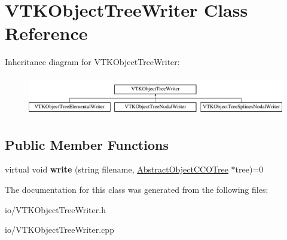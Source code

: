 \hypertarget{class_v_t_k_object_tree_writer}{}\section{V\+T\+K\+Object\+Tree\+Writer Class Reference}
\label{class_v_t_k_object_tree_writer}
Inheritance diagram for V\+T\+K\+Object\+Tree\+Writer\+:\begin{figure}[H]
\begin{center}
\leavevmode
\includegraphics[height=1.736434cm]{d0/d87/class_v_t_k_object_tree_writer}
\end{center}
\end{figure}
\subsection*{Public Member Functions}
\begin{DoxyCompactItemize}
\item 
virtual void {\bfseries write} (string filename, \hyperlink{class_abstract_object_c_c_o_tree}{Abstract\+Object\+C\+C\+O\+Tree} $\ast$tree)=0\hypertarget{class_v_t_k_object_tree_writer_ad4fb3ded12a62224613c0dc6fce8c610}{}\label{class_v_t_k_object_tree_writer_ad4fb3ded12a62224613c0dc6fce8c610}

\end{DoxyCompactItemize}


The documentation for this class was generated from the following files\+:\begin{DoxyCompactItemize}
\item 
io/V\+T\+K\+Object\+Tree\+Writer.\+h\item 
io/V\+T\+K\+Object\+Tree\+Writer.\+cpp\end{DoxyCompactItemize}
